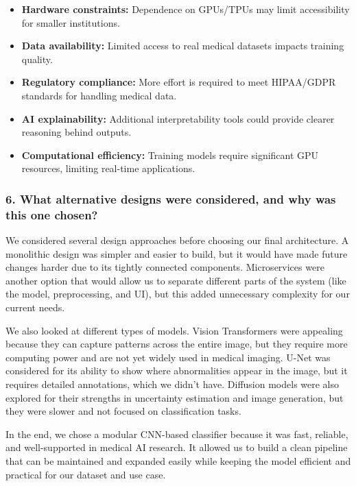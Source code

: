 \documentclass[12pt, titlepage]{article}
\begin{document}
\begin{itemize}
    \item \textbf{Hardware constraints:} Dependence on GPUs/TPUs may limit accessibility for smaller institutions.
    \item \textbf{Data availability:} Limited access to real medical datasets impacts training quality.
    \item \textbf{Regulatory compliance:} More effort is required to meet HIPAA/GDPR standards for handling medical data.
    \item \textbf{AI explainability:} Additional interpretability tools could provide clearer reasoning behind outputs.
    \item \textbf{Computational efficiency:} Training models require significant GPU resources, limiting real-time applications.
\end{itemize}

\subsubsection{6. What alternative designs were considered, and why was this one chosen?}
\label{sec:alternativedesigns}

We considered several design approaches before choosing our final architecture. A monolithic design was simpler and easier to build, but it would have made future changes harder due to its tightly connected components. Microservices were another option that would allow us to separate different parts of the system (like the model, preprocessing, and UI), but this added unnecessary complexity for our current needs.

We also looked at different types of models. Vision Transformers were appealing because they can capture patterns across the entire image, but they require more computing power and are not yet widely used in medical imaging. U-Net was considered for its ability to show where abnormalities appear in the image, but it requires detailed annotations, which we didn’t have. Diffusion models were also explored for their strengths in uncertainty estimation and image generation, but they were slower and not focused on classification tasks.

In the end, we chose a modular CNN-based classifier because it was fast, reliable, and well-supported in medical AI research. It allowed us to build a clean pipeline that can be maintained and expanded easily while keeping the model efficient and practical for our dataset and use case.
\end{document}
